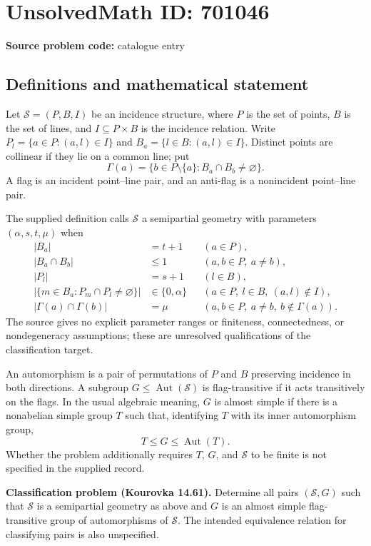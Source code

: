 \documentclass[11pt]{article}
\begin{document}
\section*{UnsolvedMath ID: 701046}
\textbf{Source problem code:} catalogue entry
\subsection{Definitions and mathematical statement}
Let \(\mathcal S=(P,B,I)\) be an incidence structure, where \(P\) is the set of points, \(B\) is the set of lines, and \(I\subseteq P\times B\) is the incidence relation. Write \(P_l=\{a\in P:(a,l)\in I\}\) and \(B_a=\{l\in B:(a,l)\in I\}\). Distinct points are collinear if they lie on a common line; put
\[
\Gamma(a)=\{b\in P\setminus\{a\}:B_a\cap B_b\ne\varnothing\}.
\]
A flag is an incident point--line pair, and an anti-flag is a nonincident point--line pair.

The supplied definition calls \(\mathcal S\) a semipartial geometry with parameters \((\alpha,s,t,\mu)\) when
\begin{align*}
|B_a|&=t+1 &&(a\in P),\\
|B_a\cap B_b|&\leq 1 &&(a,b\in P,\ a\ne b),\\
|P_l|&=s+1 &&(l\in B),\\
\bigl|\{m\in B_a:P_m\cap P_l\ne\varnothing\}\bigr|&\in\{0,\alpha\}
&&(a\in P,\ l\in B,\ (a,l)\notin I),\\
|\Gamma(a)\cap\Gamma(b)|&=\mu
&&(a,b\in P,\ a\ne b,\ b\notin\Gamma(a)).
\end{align*}
The source gives no explicit parameter ranges or finiteness, connectedness, or nondegeneracy assumptions; these are unresolved qualifications of the classification target.

An automorphism is a pair of permutations of \(P\) and \(B\) preserving incidence in both directions. A subgroup \(G\leq\operatorname{Aut}(\mathcal S)\) is flag-transitive if it acts transitively on the flags. In the usual algebraic meaning, \(G\) is almost simple if there is a nonabelian simple group \(T\) such that, identifying \(T\) with its inner automorphism group,
\[
T\leq G\leq\operatorname{Aut}(T).
\]
Whether the problem additionally requires \(T\), \(G\), and \(\mathcal S\) to be finite is not specified in the supplied record.

\textbf{Classification problem (Kourovka 14.61).} Determine all pairs \((\mathcal S,G)\) such that \(\mathcal S\) is a semipartial geometry as above and \(G\) is an almost simple flag-transitive group of automorphisms of \(\mathcal S\). The intended equivalence relation for classifying pairs is also unspecified.
\end{document}
